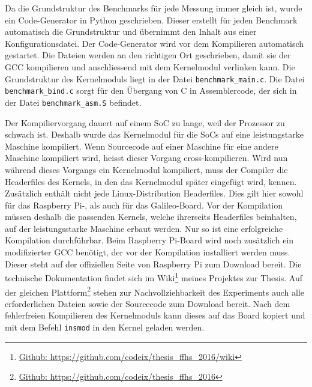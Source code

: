 Da die Grundstruktur des Benchmarks für jede Messung immer gleich ist, wurde ein Code-Generator in Python geschrieben. Dieser erstellt für jeden Benchmark automatisch die Grundstruktur und übernimmt den Inhalt aus einer Konfigurationsdatei. Der Code-Generator wird vor dem Kompilieren automatisch gestartet. Die Dateien werden an den richtigen Ort geschrieben, damit sie der GCC kompilieren und anschliessend mit dem Kernelmodul verlinken kann. Die Grundstruktur des Kernelmoduls liegt in der Datei \texttt{benchmark\_main.c}. Die Datei \texttt{benchmark\_bind.c} sorgt für den Übergang von C in Assemblercode, der sich in der Datei \texttt{benchmark\_asm.S} befindet.
\par
Der Kompiliervorgang dauert auf einem SoC zu lange, weil der Prozessor zu schwach ist. Deshalb wurde das Kernelmodul für die SoCs auf eine leistungstarke Maschine kompiliert. Wenn Sourcecode auf einer Maschine für eine andere Maschine kompiliert wird, heisst dieser Vorgang cross-kompilieren. Wird nun während dieses Vorgangs ein Kernelmodul kompiliert, muss der Compiler die Headerfiles des Kernels, in den das Kernelmodul später eingefügt wird, kennen. Zusätzlich enthält nicht jede Linux-Distribution Headerfiles. Dies gilt hier sowohl für das Raspberry Pi-, als auch für das Galileo-Board. Vor der Kompilation müssen deshalb die passenden Kernels, welche ihrerseits Headerfiles beinhalten, auf der leistungsstarke Maschine erbaut werden. Nur so ist eine erfolgreiche Kompilation durchführbar. Beim Raspberry Pi-Board wird noch zusätzlich ein modifizierter GCC benötigt, der vor der Kompilation installiert werden muss. Dieser steht auf der offiziellen Seite von Raspberry Pi zum Download bereit. Die technische Dokumentation findet sich im Wiki\footnote{\url{Github: https://github.com/codeix/thesis_ffhs_2016/wiki}} meines Projektes zur Thesis. Auf der gleichen Plattform\footnote{\url{Github: https://github.com/codeix/thesis_ffhs_2016}} stehen zur Nachvollziehbarkeit des Experiments auch alle erforderlichen Dateien sowie der Sourcecode zum Download bereit. Nach dem fehlerfreien Kompilieren des Kernelmoduls kann dieses auf das Board kopiert und mit dem Befehl \texttt{insmod} in den Kernel geladen werden.


